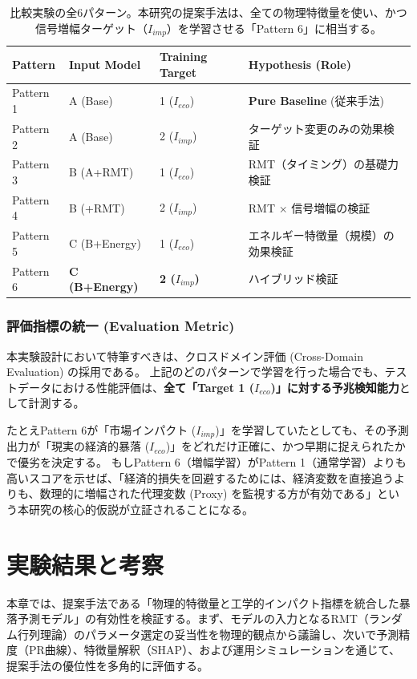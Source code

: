 \documentclass[11pt,a4paper,oneside]{ltjsarticle}
\begin{document}
\begin{table}[htbp]
  \centering
  \caption{比較実験の全6パターン。本研究の提案手法は、全ての物理特徴量を使い、かつ信号増幅ターゲット（$I_{imp}$）を学習させる「Pattern 6」に相当する。}
  \label{tab:exp_patterns}
  \begin{tabular}{l|l|l|l}
    \hline
    \textbf{Pattern} & \textbf{Input Model} & \textbf{Training Target} & \textbf{Hypothesis (Role)} \\
    \hline
    Pattern 1 & A (Base) & 1 ($I_{eco}$) & \textbf{Pure Baseline} (従来手法) \\
    Pattern 2 & A (Base) & 2 ($I_{imp}$) & ターゲット変更のみの効果検証 \\
    \hline
    Pattern 3 & B (A+RMT) & 1 ($I_{eco}$) & RMT（タイミング）の基礎力検証 \\
    Pattern 4 & B (+RMT) & 2 ($I_{imp}$) & RMT $\times$ 信号増幅の検証 \\
    \hline
    Pattern 5 & C (B+Energy) & 1 ($I_{eco}$) & エネルギー特徴量（規模）の効果検証 \\
    Pattern 6 & \textbf{C (B+Energy)} & \textbf{2 ($I_{imp}$)} & ハイブリッド検証 \\
    \hline
  \end{tabular}
\end{table}

\subsubsection{評価指標の統一 (Evaluation Metric)}
本実験設計において特筆すべきは、クロスドメイン評価 (Cross-Domain Evaluation) の採用である。
上記のどのパターンで学習を行った場合でも、テストデータにおける性能評価は、\textbf{全て「Target 1 ($I_{eco}$)」に対する予兆検知能力}として計測する。

たとえPattern 6が「市場インパクト ($I_{imp}$)」を学習していたとしても、その予測出力が「現実の経済的暴落 ($I_{eco}$)」をどれだけ正確に、かつ早期に捉えられたかで優劣を決定する。
もしPattern 6（増幅学習）がPattern 1（通常学習）よりも高いスコアを示せば、「経済的損失を回避するためには、経済変数を直接追うよりも、数理的に増幅された代理変数 (Proxy) を監視する方が有効である」という本研究の核心的仮説が立証されることになる。








\clearpage
\section{実験結果と考察}
本章では、提案手法である「物理的特徴量と工学的インパクト指標を統合した暴落予測モデル」の有効性を検証する。まず、モデルの入力となるRMT（ランダム行列理論）のパラメータ選定の妥当性を物理的観点から議論し、次いで予測精度（PR曲線）、特徴量解釈（SHAP）、および運用シミュレーションを通じて、提案手法の優位性を多角的に評価する。
\end{document}
